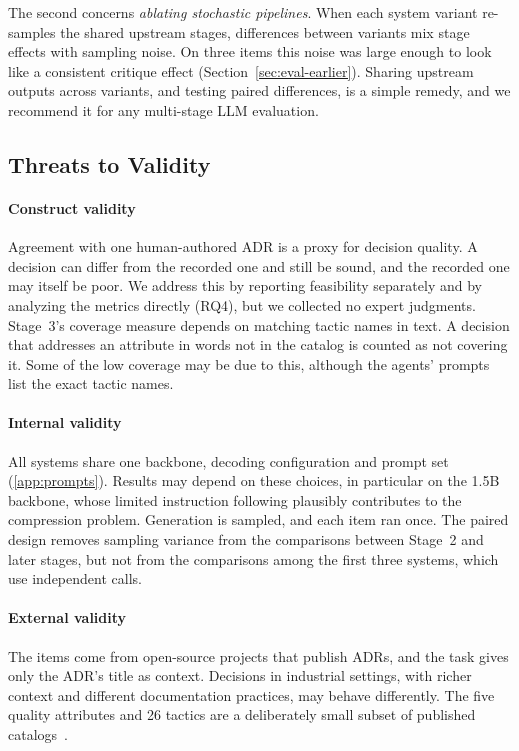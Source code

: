 \documentclass[preprint,12pt,authoryear]{elsarticle}
\renewcommand{\_}{\textunderscore\allowbreak{}}
\begin{document}
The second concerns \emph{ablating stochastic pipelines}. When each system variant re-samples the shared upstream stages, differences between variants mix stage effects with sampling noise. On three items this noise was large enough to look like a consistent critique effect (Section~\ref{sec:eval-earlier}). Sharing upstream outputs across variants, and testing paired differences, is a simple remedy, and we recommend it for any multi-stage LLM evaluation.

\subsection{Threats to Validity}

\paragraph{Construct validity} Agreement with one human-authored ADR is a proxy for decision quality. A decision can differ from the recorded one and still be sound, and the recorded one may itself be poor. We address this by reporting feasibility separately and by analyzing the metrics directly (RQ4), but we collected no expert judgments. Stage~3's coverage measure depends on matching tactic names in text. A decision that addresses an attribute in words not in the catalog is counted as not covering it. Some of the low coverage may be due to this, although the agents' prompts list the exact tactic names.

\paragraph{Internal validity} All systems share one backbone, decoding configuration and prompt set (\ref{app:prompts}). Results may depend on these choices, in particular on the 1.5B backbone, whose limited instruction following plausibly contributes to the compression problem. Generation is sampled, and each item ran once. The paired design removes sampling variance from the comparisons between Stage~2 and later stages, but not from the comparisons among the first three systems, which use independent calls.

\paragraph{External validity} The items come from open-source projects that publish ADRs, and the task gives only the ADR's title as context. Decisions in industrial settings, with richer context and different documentation practices, may behave differently. The five quality attributes and 26 tactics are a deliberately small subset of published catalogs~\citep{marquez2023}.
\end{document}
